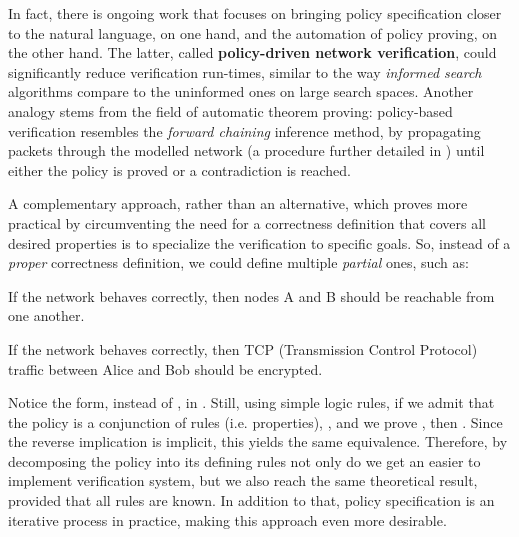 In fact, there is ongoing work that focuses on bringing policy specification
closer to the natural language, on one hand, and the automation of policy
proving, on the other hand.  The latter, called \textbf{policy-driven network
verification}, could significantly reduce verification run-times, similar to
the way \emph{informed search} algorithms compare to the uninformed ones on
large search spaces.  Another analogy stems from the field of automatic theorem
proving: policy-based verification resembles the \emph{forward chaining}
inference method, by propagating packets through the modelled network (a
procedure further detailed in ) until
either the policy is proved or a contradiction is reached.

A complementary approach, rather than an alternative, which proves more
practical by circumventing the need for a correctness definition that covers
all desired properties is to specialize the verification to specific goals.
So, instead of a \emph{proper} correctness definition, we could define multiple
\emph{partial} ones, such as:

\begin{definition}
If the network behaves correctly, then nodes A and B should be reachable from
one another.
\end{definition}

\begin{definition}
If the network behaves correctly, then TCP (Transmission Control
Protocol) traffic between Alice
and Bob should be encrypted.
\end{definition}

Notice the  form, instead of
, in
.  Still, using simple logic
rules, if we admit that the policy is a conjunction of rules (i.e. properties),
, and we prove
, then
.  Since the reverse implication is implicit,
this yields the same equivalence.  Therefore, by decomposing the policy into
its defining rules not only do we get an easier to implement verification
system, but we also reach the same theoretical result, provided that all rules
are known.  In addition to that, policy specification is an iterative process
in practice, making this approach even more desirable.


